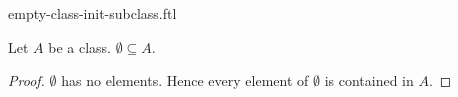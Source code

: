 \documentclass{stex}
\begin{document}
\begin{smodule}{empty-class-init-subclass.ftl}

  \begin{forthel}
    \begin{proposition}
      Let $A$ be a class.
      $\emptyset \subseteq A$.
    \end{proposition}
    \begin{proof}
      $\emptyset$ has no elements.
      Hence every element of $\emptyset$ is contained in $A$.
    \end{proof}
  \end{forthel}
\end{smodule}
\end{document}
